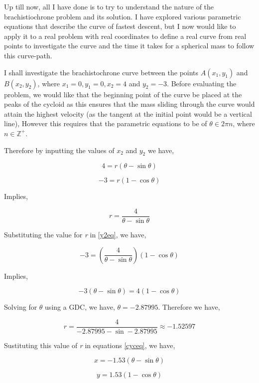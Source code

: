 

{Up till now, all I have done is to try to understand the nature of the brachistiochrone problem and its solution. I have explored various parametric equations that describe the curve of fastest descent, but I now would like to apply it to a real problem with real coordinates to define a real curve from real points to investigate the curve and the time it takes for a spherical mass to follow this curve-path.}

{I shall investigate the brachistochrone curve between the points $A(x_{1},y_{1})$ and $B(x_{2},y_{2})$, where $x_{1} = 0, y_{1} = 0, x_{2} = 4$ and $y_{2} = -3$. Before evaluating the problem, we would like that the beginning point of the curve be placed at the peaks of the cycloid as this ensures that the mass sliding through the curve would attain the highest velocity (as the tangent at the initial point would be a vertical line), However this requires that the parametric equations to be of $\theta\in2\pi n$, where $n\in\mathbb{Z}^{+}$.}

{Therefore by inputting the values of $x_{2}$ and $y_{2}$ we have,}

	\begin{equation}
		4 = r\left(\theta - \sin\theta\right)
		\label{x2eq}
	\end{equation}

	\begin{equation}
		-3 = r\left(1 - \cos\theta\right)
		\label{y2eq}
	\end{equation}

{Implies,}

	$$r = \frac{4}{\theta - \sin\theta}$$

{Substituting the value for \textit{r} in \ref{y2eq}, we have,}

	$$-3 = \left(\frac{4}{\theta - \sin\theta}\right)\left(1 - \cos\theta\right)$$

{Implies,}

	$$-3\left(\theta - \sin\theta\right) = 4\left(1 - \cos\theta\right)$$

{Solving for $\theta$ using a GDC, we have, $\theta = -2.87995$. Therefore we have,}

	$$r = \frac{4}{-2.87995 - \sin -2.87995} \approx -1.52597$$

{Sustituting this value of \textit{r} in equations \ref{cyceq}, we have,}

	$$x = -1.53\left(\theta - \sin\theta\right)$$

	$$y = 1.53\left(1 - \cos\theta\right)$$

